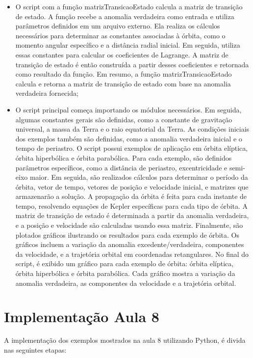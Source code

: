\begin{itemize}
    \item O script com a função matrizTransicaoEstado calcula a matriz de transição de estado. A função recebe a anomalia verdadeira como entrada e utiliza parâmetros definidos em um arquivo externo. Ela realiza os cálculos necessários para determinar as constantes associadas à órbita, como o momento angular específico e a distância radial inicial. Em seguida, utiliza essas constantes para calcular os coeficientes de Lagrange. A matriz de transição de estado é então construída a partir desses coeficientes e retornada como resultado da função. Em resumo, a função matrizTransicaoEstado calcula e retorna a matriz de transição de estado com base na anomalia verdadeira fornecida;
    \item O script principal começa importando os módulos necessários. Em seguida, algumas constantes gerais são definidas, como a constante de gravitação universal, a massa da Terra e o raio equatorial da Terra. As condições iniciais dos exemplos também são definidas, como a anomalia verdadeira inicial e o tempo de periastro. O script possui exemplos de aplicação em órbita elíptica, órbita hiperbólica e órbita parabólica. Para cada exemplo, são definidos parâmetros específicos, como a distância de periastro, excentricidade e semi-eixo maior. Em seguida, são realizados cálculos para determinar o período da órbita, vetor de tempo, vetores de posição e velocidade inicial, e matrizes que armazenarão a solução. A propagação da órbita é feita para cada instante de tempo, resolvendo equações de Kepler específicas para cada tipo de órbita. A matriz de transição de estado é determinada a partir da anomalia verdadeira, e a posição e velocidade são calculadas usando essa matriz. Finalmente, são plotados gráficos ilustrando os resultados para cada exemplo de órbita. Os gráficos incluem a variação da anomalia excedente/verdadeira, componentes da velocidade, e a trajetória orbital em coordenadas retangulares. No final do script, é exibido um gráfico para cada exemplo de órbita: órbita elíptica, órbita hiperbólica e órbita parabólica. Cada gráfico mostra a variação da anomalia verdadeira, as componentes da velocidade e a trajetória orbital.
\end{itemize}

\section{Implementação Aula 8}

A implementação dos exemplos mostrados na aula 8 utilizando Python, é divida nas seguintes etapas:

